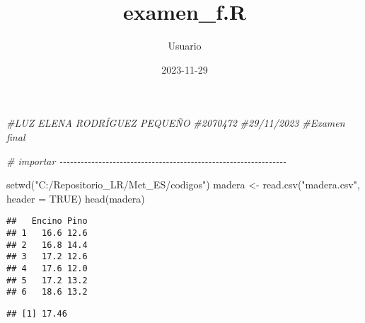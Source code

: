 \documentclass[
]{article}
\title{examen\_f.R}
\author{Usuario}
\date{2023-11-29}
\newenvironment{Shaded}{\begin{snugshade}}{\end{snugshade}}
\newcommand{\AttributeTok}[1]{\textcolor[rgb]{0.77,0.63,0.00}{#1}}
\newcommand{\CommentTok}[1]{\textcolor[rgb]{0.56,0.35,0.01}{\textit{#1}}}
\newcommand{\ConstantTok}[1]{\textcolor[rgb]{0.00,0.00,0.00}{#1}}
\newcommand{\FunctionTok}[1]{\textcolor[rgb]{0.00,0.00,0.00}{#1}}
\newcommand{\NormalTok}[1]{#1}
\newcommand{\OtherTok}[1]{\textcolor[rgb]{0.56,0.35,0.01}{#1}}
\newcommand{\SpecialCharTok}[1]{\textcolor[rgb]{0.00,0.00,0.00}{#1}}
\newcommand{\StringTok}[1]{\textcolor[rgb]{0.31,0.60,0.02}{#1}}
\begin{document}
\maketitle

\begin{Shaded}
\begin{Highlighting}[]
\CommentTok{\#LUZ ELENA RODRÍGUEZ PEQUEÑO}
\CommentTok{\#2070472}
\CommentTok{\#29/11/2023}
\CommentTok{\#Examen final}

\CommentTok{\# importar {-}{-}{-}{-}{-}{-}{-}{-}{-}{-}{-}{-}{-}{-}{-}{-}{-}{-}{-}{-}{-}{-}{-}{-}{-}{-}{-}{-}{-}{-}{-}{-}{-}{-}{-}{-}{-}{-}{-}{-}{-}{-}{-}{-}{-}{-}{-}{-}{-}{-}{-}{-}{-}{-}{-}{-}{-}{-}{-}{-}{-}{-}{-}{-}}

\FunctionTok{setwd}\NormalTok{(}\StringTok{"C:/Repositorio\_LR/Met\_ES/codigos"}\NormalTok{)}
\NormalTok{madera }\OtherTok{\textless{}{-}} \FunctionTok{read.csv}\NormalTok{(}\StringTok{"madera.csv"}\NormalTok{, }\AttributeTok{header =} \ConstantTok{TRUE}\NormalTok{) }
\FunctionTok{head}\NormalTok{(madera)}
\end{Highlighting}
\end{Shaded}

\begin{verbatim}
##   Encino Pino
## 1   16.6 12.6
## 2   16.8 14.4
## 3   17.2 12.6
## 4   17.6 12.0
## 5   17.2 13.2
## 6   18.6 13.2
\end{verbatim}

\begin{Shaded}
\end{Shaded}

\begin{verbatim}
## [1] 17.46
\end{verbatim}

\begin{Shaded}
\end{Shaded}
\end{document}
